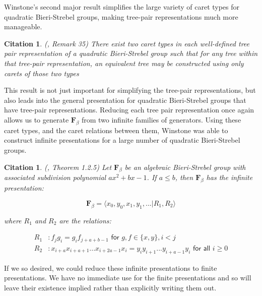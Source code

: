 \documentclass[
11pt, %
english, %
singlespacing, %
parskip, %
headsepline, %
]{amsart} %
\newtheorem{citing}[theorem]{Citation}
\theoremstyle{definition}
\newcommand{\FN}[1]{$\textbf{F}_{#1}$}
\begin{document}
Winstone's second major result simplifies the large variety of caret types for quadratic Bieri-Strebel groups, making tree-pair representations much more manageable.

\begin{citing}\label{twocaret}
(\cite{Winstone}, Remark 35) There exist two caret types in each well-defined tree pair representation of a quadratic Bieri-Strebel group such that for any tree within that tree-pair representation, an equivalent tree may be constructed using only carets of those two types
\end{citing}

This result is not just important for simplifying the tree-pair representations, but also leads into the general presentation for quadratic Bieri-Strebel groups that have tree-pair representations. Reducing each tree pair representation once again allows us to generate \FN{\beta} from two infinite families of generators. Using these caret types, and the caret relations between them, Winstone was able to construct infinite presentations for a large number of quadratic Bieri-Strebel groups.

\begin{citing}\label{betapres}
(\cite{Winstone}, Theorem 1.2.5) Let \FN{\beta} be an algebraic Bieri-Strebel group with associated subdivision polynomial $ax^2+bx-1$. If $a \leq b$, then \FN{\beta} has the infinite presentation:

\begin{equation}
\textbf{F}_\beta = \langle x_0, y_0, x_1, y_1,...| R_1, R_2 \rangle
\end{equation}


where $R_1$ and $R_2$ are the relations:

\begin{equation}
\begin{aligned}
R_1 & : f_j g_i = g_i f_{j+a+b-1} \textsf{ for } g,f \in \{x,y\}, i < j \\
R_2 & : x_{i+a} x_{i+a+1}...x_{i+2a-1} x_i = y_{i} y_{i+1} ... y_{i+a-1} y_i \textsf{ for all } i \geq 0
\end{aligned}
\end{equation}
\end{citing}

If we so desired, we could reduce these infinite presentations to finite presentations. We have no immediate use for the finite presentations and so will leave their existence implied rather than explicitly writing them out.
\end{document}
